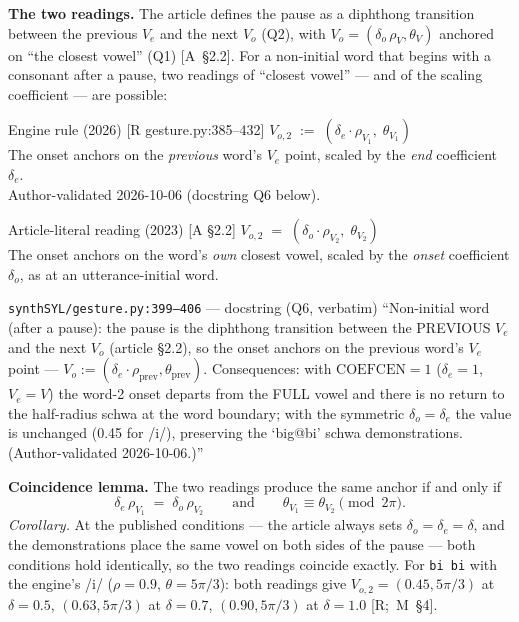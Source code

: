 \documentclass[11pt,letterpaper]{article}
\newcommand{\code}[1]{\texttt{#1}}
\begin{document}
\textbf{The two readings.} The article defines the pause as a diphthong
transition between the previous $V_e$ and the next $V_o$ (Q2), with
$V_o = (\delta_o\,\rho_V, \theta_V)$ anchored on ``the closest vowel'' (Q1)
\hbox{[A \S2.2]}. For a non-initial word that begins with a consonant after a
pause, two readings of ``closest vowel'' --- and of the scaling coefficient
--- are possible:
\begin{center}
\begin{minipage}[t]{0.485\textwidth}
\begin{qbox}{Engine rule (2026) [R gesture.py:385--432]}
\small
$V_{o,2} \;:=\; (\delta_e \cdot \rho_{V_1},\; \theta_{V_1})$
\\[3pt]
The onset anchors on the \emph{previous} word's $V_e$ point, scaled by the
\emph{end} coefficient $\delta_e$.
\\[3pt]
Author-validated 2026-10-06 (docstring Q6 below).
\end{qbox}
\end{minipage}\hfill
\begin{minipage}[t]{0.485\textwidth}
\begin{qbox}{Article-literal reading (2023) [A \S2.2]}
\small
$V_{o,2} \;=\; (\delta_o \cdot \rho_{V_2},\; \theta_{V_2})$
\\[3pt]
The onset anchors on the word's \emph{own} closest vowel, scaled by the
\emph{onset} coefficient $\delta_o$, as at an utterance-initial word.
\end{qbox}
\end{minipage}
\end{center}

\begin{qbox}{\code{synthSYL/gesture.py:399--406} --- docstring (Q6, verbatim)}
\small
``Non-initial word (after a pause): the pause is the diphthong transition
between the PREVIOUS $V_e$ and the next $V_o$ (article \S2.2), so the onset
anchors on the previous word's $V_e$ point --- $V_o := (\delta_e \cdot
\rho_{\text{prev}}, \theta_{\text{prev}})$. Consequences: with
$\text{COEFCEN} = 1$ ($\delta_e = 1$, $V_e = V$) the word-2 onset departs
from the FULL vowel and there is no return to the half-radius schwa at the
word boundary; with the symmetric $\delta_o = \delta_e$ the value is
unchanged (0.45 for /i/), preserving the `big@bi' schwa demonstrations.
(Author-validated 2026-10-06.)''
\end{qbox}

\textbf{Coincidence lemma.} The two readings produce the same anchor if and
only if
\begin{equation}
\delta_e\,\rho_{V_1} \;=\; \delta_o\,\rho_{V_2}
\qquad\text{and}\qquad
\theta_{V_1} \equiv \theta_{V_2} \pmod{2\pi}.
\label{eq:coincidence}
\end{equation}
\emph{Corollary.} At the published conditions --- the article always sets
$\delta_o=\delta_e=\delta$, and the demonstrations place the same vowel on
both sides of the pause --- both conditions hold identically, so the two
readings coincide exactly. For \code{bi\,bi} with the engine's /i/
($\rho=0.9$, $\theta=5\pi/3$): both readings give $V_{o,2} = (0.45,
5\pi/3)$ at $\delta=0.5$, $(0.63, 5\pi/3)$ at $\delta=0.7$, $(0.90,
5\pi/3)$ at $\delta=1.0$ \hbox{[R; M \S4]}.
\end{document}

